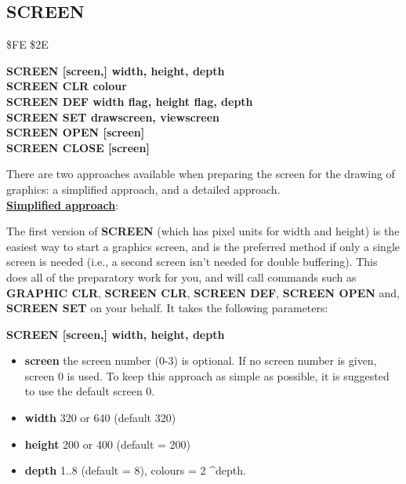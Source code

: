 \subsection{SCREEN}
\begin{description}[leftmargin=2cm,style=nextline]
\item [Token:] \$FE \$2E
\item [Format:] {\bf SCREEN [screen,] width, height, depth} \\
                {\bf SCREEN CLR colour} \\
                {\bf SCREEN DEF width flag, height flag, depth} \\
                {\bf SCREEN SET drawscreen, viewscreen} \\
                {\bf SCREEN OPEN [screen]} \\
                {\bf SCREEN CLOSE [screen]}

\item [Usage:] There are two approaches available when preparing the screen for the
               drawing of graphics: a simplified approach, and a detailed approach.
\\
    \underline{{\bf Simplified approach}}:

               The first version of {\bf SCREEN} (which has pixel
               units for width and height) is the easiest
               way to start a graphics screen, and is the preferred
               method if only a single screen is needed (i.e., a second screen
               isn't needed for double buffering). This does all of the
               preparatory work for you, and will call commands such as
               {\bf GRAPHIC CLR}, {\bf SCREEN CLR}, {\bf SCREEN DEF},
               {\bf SCREEN OPEN} and, {\bf SCREEN SET}
               on your behalf. It takes the following parameters:

               {\bf SCREEN [screen,] width, height, depth}

               \begin{itemize}
                \item {\bf screen} the screen number (0-3) is optional.
                If no screen number is given, screen 0 is used. To keep
                   this approach as simple as possible, it is suggested to
                   use the default screen 0.
                \item {\bf width} 320 or 640 (default 320)
                \item {\bf height} 200 or 400 (default = 200)
                \item {\bf depth} 1..8 (default = 8),
                   colours = 2 \textasciicircum depth.
               \end{itemize}


\end{description}
